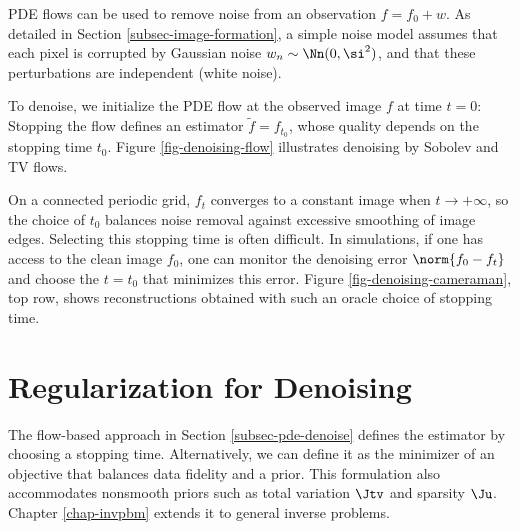 PDE flows can be used to remove noise from an observation $f= f_0 + w$. As detailed in Section \ref{subsec-image-formation}, a simple noise model assumes that each pixel is corrupted by Gaussian noise $w_n \sim \Nn(0,\si^2)$, and that these perturbations are independent (white noise).

To denoise, we initialize the PDE flow at the observed image $f$ at time $t=0$:
Stopping the flow defines an estimator $\tilde f = f_{t_0}$, whose quality depends on the stopping time $t_0$. Figure \ref{fig-denoising-flow} illustrates denoising by Sobolev and TV flows.


On a connected periodic grid, $f_t$ converges to a constant image when $t \rightarrow +\infty$, so the choice of $t_0$ balances noise removal against excessive smoothing of image edges. Selecting this stopping time is often difficult. In simulations, if one has access to the clean image $f_0$, one can monitor the denoising error $\norm{f_0-f_t}$ and choose the $t=t_0$ that minimizes this error. Figure \ref{fig-denoising-cameraman}, top row, shows reconstructions obtained with such an oracle choice of stopping time.


                                                                      
                                                                      
                                                                      
\section{Regularization for Denoising}

The flow-based approach in Section \ref{subsec-pde-denoise} defines the estimator by choosing a stopping time. Alternatively, we can define it as the minimizer of an objective that balances data fidelity and a prior. This formulation also accommodates nonsmooth priors such as total variation $\Jtv$ and sparsity $\Ju$. Chapter \ref{chap-invpbm} extends it to general inverse problems.


